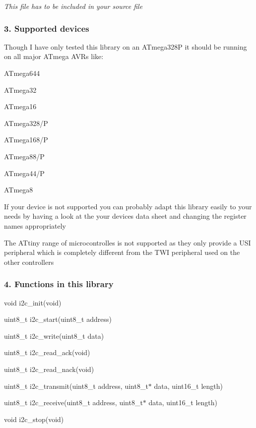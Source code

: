 {\itshape This file has to be included in your source file} 



\subsubsection*{3. Supported devices}

Though I have only tested this library on an A\+Tmega328P it should be running on all major A\+Tmega A\+V\+Rs like\+:


\begin{DoxyItemize}
\item A\+Tmega644
\item A\+Tmega32
\item A\+Tmega16
\item A\+Tmega328/P
\item A\+Tmega168/P
\item A\+Tmega88/P
\item A\+Tmega44/P
\item A\+Tmega8
\end{DoxyItemize}

If your device is not supported you can probably adapt this library easily to your needs by having a look at the your device\textquotesingle{}s data sheet and changing the register names appropriately

The A\+Ttiny range of microcontrolles is not supported as they only provide a U\+SI peripheral which is completely different from the T\+WI peripheral used on the other controllers 



\subsubsection*{4. Functions in this library}


\begin{DoxyItemize}
\item void i2c\+\_\+init(void)
\item uint8\+\_\+t i2c\+\_\+start(uint8\+\_\+t address)
\item uint8\+\_\+t i2c\+\_\+write(uint8\+\_\+t data)
\item uint8\+\_\+t i2c\+\_\+read\+\_\+ack(void)
\item uint8\+\_\+t i2c\+\_\+read\+\_\+nack(void)
\item uint8\+\_\+t i2c\+\_\+transmit(uint8\+\_\+t address, uint8\+\_\+t$\ast$ data, uint16\+\_\+t length)
\item uint8\+\_\+t i2c\+\_\+receive(uint8\+\_\+t address, uint8\+\_\+t$\ast$ data, uint16\+\_\+t length)
\item void i2c\+\_\+stop(void)
\end{DoxyItemize}

